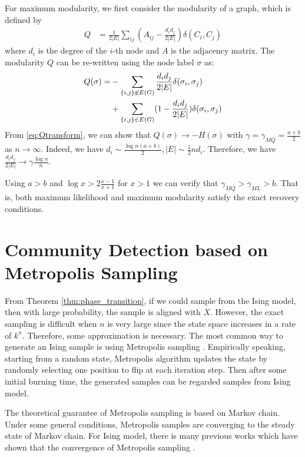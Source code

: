 \documentclass[journal]{IEEEtran}
\newcommand{\1}{\mathbbm{1}}
\begin{document}
For maximum modularity, we first consider the modularity of a graph, which is defined by
\begin{align}\label{eq:Q}
Q &= \frac{1}{2 |E|} \sum_{ij} (A_{ij} - \frac{d_i d_j}{2 |E|}) \delta(C_i, C_j)
\end{align}
where $d_i$ is the degree of the $i$-th node and $A$ is the adjacency matrix.
The modularity $Q$ can be re-written using the node label $\sigma$ as:
\begin{align}
Q(\sigma) = &-\sum_{\{i,j\} \not\in E(G) } \frac{d_i d_j}{2 |E|}\delta(\sigma_i,\sigma_j) \notag \\
&+ \sum_{\{i,j\} \in E(G) } (1 - \frac{d_i d_j}{2 |E|}) \delta(\sigma_i,\sigma_j)  \label{eq:Qtransform}
\end{align}
From \eqref{eq:Qtransform}, we can show that $Q(\sigma) \to -H(\sigma)$ with $\gamma = \gamma_{MQ} = \frac{a+b}{2}$ as $n\to \infty$.
Indeed, we have $d_i \sim \frac{\log n(a+b)}{2}, |E| \sim \frac{1}{2}n d_i$. Therefore, we have $\frac{d_id_j}{2|E|} \to \gamma \frac{\log n}{n} $.

Using $a>b$ and $\log x > 2 \frac{x-1}{x+1}$ for $x>1$ we can verify that $\gamma_{MQ} > \gamma_{ML} > b$. That is, both maximum likelihood and maximum modularity satisfy the exact recovery conditions.


\section{Community Detection based on Metropolis Sampling}\label{sec:ms}
From Theorem \ref{thm:phase_transition}, if we could sample from the Ising model, then with large probability, the sample
is aligned with $X$. However, the exact sampling is difficult when $n$ is very large since the state space increases in
a rate of $k^n$. Therefore, some approximation is
necessary. The most common way to generate an Ising sample is using Metropolis sampling \cite{metropolis1953equation}. 
Empirically speaking, starting from a random state, Metropolis algorithm updates the state by randomly selecting one position to flip at each iteration step.
Then after some initial burning time, the generated samples can be regarded samples from Ising model.

The theoretical guarantee of Metropolis sampling is based on Markov chain. Under some general conditions, Metropolis samples are converging to
the steady state of Markov chain. For Ising model, there is many previous works which have shown that
the convergence of Metropolis sampling \cite{diaconis1998we}.
\end{document}
